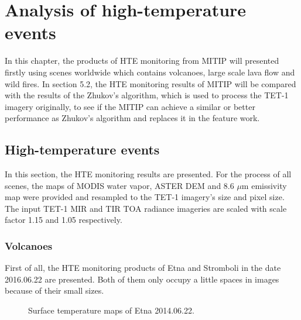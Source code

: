 \chapter{Analysis of high-temperature events}

\label{Chapter5}

In this chapter, the products of HTE monitoring from MITIP will presented firstly using scenes worldwide which contains volcanoes, large scale lava flow and wild fires. In section 5.2, the HTE monitoring results of MITIP will be compared with the results of the Zhukov's algorithm, which is used to process the TET-1 imagery originally, to see if the MITIP can achieve a similar or better performance as Zhukov's algorithm and replaces it in the feature work.\\

\section{High-temperature events}
In this section, the HTE monitoring results are presented. For the process of all scenes, the maps of MODIS water vapor, ASTER DEM and 8.6 $\mu$m emissivity map were provided and resampled to the TET-1 imagery's size and pixel size. The input TET-1 MIR and TIR TOA radiance imageries are scaled with scale factor 1.15 and 1.05 respectively.\\


\subsection{Volcanoes}
First of all, the HTE monitoring products of Etna and Stromboli in the date 2016.06.22 are presented. Both of them only occupy a little spaces in images because of their small sizes.\\

\begin{figure}[!htbp]
\centering
{}
\hspace{0.1in}
\caption{Surface temperature maps of Etna 2014.06.22.}
\label{fig:Etna_sur_tem}
\end{figure}

